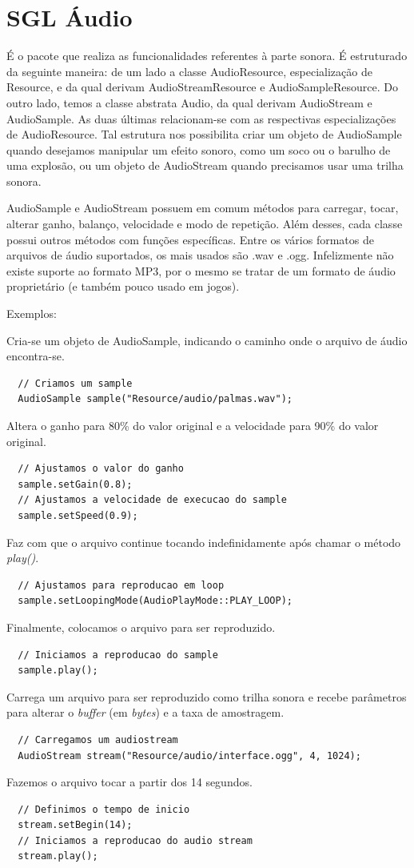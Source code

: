 \section{SGL Áudio}
%
%
É o pacote que realiza as funcionalidades referentes à parte sonora. É estruturado da seguinte maneira: de um lado a classe AudioResource, especialização de Resource, e da qual derivam AudioStreamResource e AudioSampleResource. Do outro lado, temos a classe abstrata Audio, da qual derivam AudioStream e AudioSample. As duas últimas relacionam-se com as respectivas especializações de AudioResource. Tal estrutura nos possibilita criar um objeto de AudioSample quando desejamos manipular um efeito sonoro, como um soco ou o barulho de uma explosão, ou um objeto de AudioStream quando precisamos usar uma trilha sonora.
\par 
AudioSample e AudioStream possuem em comum métodos para carregar, tocar, alterar ganho, balanço, velocidade e modo de repetição. Além desses, cada classe possui outros métodos com funções específicas. Entre os vários formatos de arquivos de áudio suportados, os mais usados são .wav e .ogg. Infelizmente não existe suporte ao formato MP3, por o mesmo se tratar de um formato de áudio proprietário (e também pouco usado em jogos).
\par
Exemplos:
\par 
Cria-se um objeto de  AudioSample, indicando o caminho onde o arquivo de áudio encontra-se.
%
\begin{lstlisting}
  // Criamos um sample
  AudioSample sample("Resource/audio/palmas.wav");
\end{lstlisting}
%
Altera o ganho para 80\% do valor original e a velocidade para 90\% do valor original.
%
\begin{lstlisting}
  // Ajustamos o valor do ganho
  sample.setGain(0.8);
  // Ajustamos a velocidade de execucao do sample
  sample.setSpeed(0.9);
\end{lstlisting}
%
Faz com que o arquivo continue tocando indefinidamente após chamar o método \textit{play()}.
%
\begin{lstlisting}
  // Ajustamos para reproducao em loop
  sample.setLoopingMode(AudioPlayMode::PLAY_LOOP);
\end{lstlisting}
%
Finalmente, colocamos o arquivo para ser reproduzido.
%
\begin{lstlisting}
  // Iniciamos a reproducao do sample
  sample.play();
\end{lstlisting}
%
%
Carrega um arquivo para ser reproduzido como trilha sonora e recebe parâmetros para alterar o \textit{buffer} (em \textit{bytes}) e a taxa de amostragem.
%
\begin{lstlisting}
  // Carregamos um audiostream
  AudioStream stream("Resource/audio/interface.ogg", 4, 1024);
\end{lstlisting}
%
Fazemos o arquivo tocar a partir dos 14 segundos.
%
\begin{lstlisting}
  // Definimos o tempo de inicio
  stream.setBegin(14);
  // Iniciamos a reproducao do audio stream
  stream.play();
\end{lstlisting}
%
%
%
